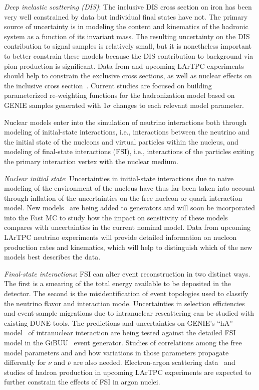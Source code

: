   \emph{Deep inelastic scattering (DIS)}: The inclusive DIS cross section on iron has been very well constrained by 
  data but individual final states have not. The primary source of uncertainty is in modeling the
  content and kinematics of the hadronic system as a function of its invariant mass. The resulting
  uncertainty on the DIS contribution to signal samples is relatively small, but it is nonetheless important
  to better constrain these models because the DIS contribution to background via pion production is significant.
  Data from \minerva and upcoming LArTPC experiments should help to constrain
  the exclusive cross sections, as well as nuclear effects on the inclusive cross section~\cite{Tice:2014pgu}.
  Current studies are focused on building parameterized re-weighting 
  functions for the hadronization model based on GENIE samples generated with 1$\sigma$ changes to each relevant 
  model parameter.

Nuclear models enter into the simulation of neutrino interactions both through modeling of initial-state interactions,
i.e., interactions between the neutrino and the initial state of the nucleons and virtual particles within the nucleus,
and modeling of final-state interactions (FSI), i.e., interactions of the particles exiting the
primary interaction vertex with the nuclear medium. 

  \emph{Nuclear initial state}: Uncertainties in initial-state interactions due to
  naive modeling of the environment of the nucleus have thus far been taken into account through inflation
  of the uncertainties on the free nucleon or quark interaction
  model. New models~\cite{Alvarez-Ruso-Hayato-Nieves:2014} are being added to generators and will soon be incorporated into the Fast MC
  to study how the impact on sensitivity of these models compares with uncertainties in the current nominal model.
  Data from upcoming LArTPC neutrino experiments will provide detailed information on nucleon production
  rates and kinematics, which will help to distinguish which of the new models best describes the data.

  \emph{Final-state interactions}: FSI can alter event reconstruction in two distinct ways. The first is a smearing
  of the total energy available to be deposited in the detector. The second is the misidentification of
  event topologies used to classify the neutrino flavor and interaction mode. Uncertainties in selection
  efficiencies and event-sample migrations
  due to intranuclear rescattering can be studied with existing DUNE tools. The predictions and
  uncertainties on GENIE's ``hA'' model~\cite{Dytman:2011zz} of intranuclear interaction
  are being tested against the detailed FSI model in the GiBUU~\cite{Buss:2011mx} event
  generator. Studies of correlations among the free model parameters and and how variations in those
  parameters propagate differently for $\nu$ and $\bar{\nu}$ are also needed. 
  Electron-argon scattering data~\cite{Benhar:2014nca}  and studies of hadron production
  in upcoming LArTPC experiments are expected to further constrain the effects of FSI in argon nuclei.

